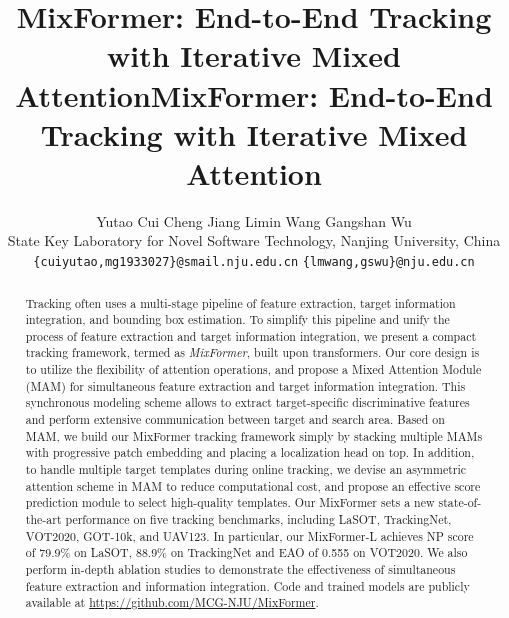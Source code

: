 \title{MixFormer: End-to-End Tracking with Iterative Mixed Attention}



\title{MixFormer: End-to-End Tracking with Iterative Mixed Attention}

\author{Yutao Cui \quad \quad Cheng Jiang \quad \quad Limin Wang \textsuperscript{\Letter} \quad \quad Gangshan Wu\\
State Key Laboratory for Novel Software Technology,
Nanjing University,
China \\
{\tt\small \{cuiyutao,mg1933027\}@smail.nju.edu.cn} \quad
{\tt\small \{lmwang,gswu\}@nju.edu.cn}
}

\maketitle
{}
\begin{abstract}
Tracking often uses a multi-stage pipeline of feature extraction, target information integration, and bounding box estimation. To simplify this pipeline and unify the process of feature extraction and target information integration, we present a compact tracking framework, termed as {\em MixFormer}, built upon transformers. Our core design is to utilize the flexibility of attention operations, and propose a Mixed Attention Module (MAM) for simultaneous feature extraction and target information integration. This synchronous modeling scheme allows to extract target-specific discriminative features and perform extensive communication between target and search area. Based on MAM, we build our MixFormer tracking framework simply by stacking multiple MAMs with progressive patch embedding and placing a localization head on top. In addition, to handle multiple target templates during online tracking, we devise an asymmetric attention scheme in MAM to reduce computational cost, and propose an effective score prediction module to select high-quality templates. 
Our MixFormer sets a new state-of-the-art performance on five tracking benchmarks, including LaSOT, TrackingNet, VOT2020, GOT-10k, and UAV123. 
In particular, our MixFormer-L achieves NP score of 79.9\% on LaSOT, 88.9\% on TrackingNet and EAO of 0.555 on VOT2020.
We also perform in-depth ablation studies to demonstrate the effectiveness of simultaneous feature extraction and information integration. Code and trained models are publicly available at \href{https://github.com/MCG-NJU/MixFormer}{https://github.com/MCG-NJU/MixFormer}.

\end{abstract}

